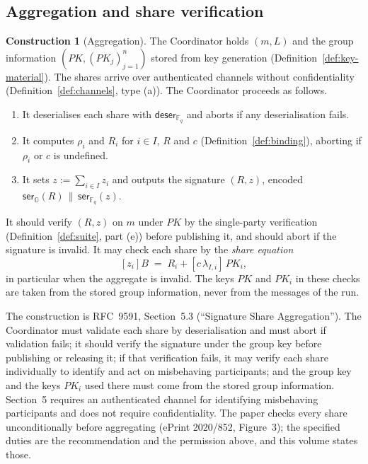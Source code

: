 \documentclass[11pt,a4paper]{article}
\theoremstyle{definition}
\newtheorem{construction}[theorem]{Construction}
\newcommand{\F}{\mathbb{F}}
\newcommand{\G}{\mathbb{G}}
\newcommand{\Fq}{\F_q}
\begin{document}
\subsection{Aggregation and share verification}\label{sec:sign-agg}

\begin{construction}[Aggregation]\label{def:aggregate}
The Coordinator holds \((m, L)\) and the group information
\((\mathit{PK}, (\mathit{PK}_j)_{j=1}^{n})\) stored from key generation
(Definition~\ref{def:key-material}). The shares arrive over authenticated
channels without confidentiality (Definition~\ref{def:channels}, type
(a)). The Coordinator proceeds as follows.
\begin{enumerate}
\item It deserialises each share with \(\mathsf{deser}_{\Fq}\) and aborts if
  any deserialisation fails.
\item It computes \(\rho_i\) and \(R_i\) for \(i \in I\), \(R\) and \(c\)
  (Definition~\ref{def:binding}), aborting if \(\rho_i\) or \(c\) is
  undefined.
\item It sets \(z := \sum_{i \in I} z_i\) and outputs the signature
  \((R, z)\), encoded
  \(\mathsf{ser}_{\G}(R) \,\|\, \mathsf{ser}_{\Fq}(z)\).
\end{enumerate}
It should verify \((R, z)\) on \(m\) under \(\mathit{PK}\) by the
single-party verification (Definition~\ref{def:suite}, part (e)) before
publishing it, and should abort if the signature is invalid. It may check
each share by the \emph{share equation}
\[
  [z_i]B \;=\; R_i + [c\, \lambda_{I,i}]\,\mathit{PK}_i ,
\]
in particular when the aggregate is invalid. The keys \(\mathit{PK}\) and
\(\mathit{PK}_i\) in these checks are taken from the stored group
information, never from the messages of the run.
\end{construction}

The construction is RFC~9591, Section~5.3 (``Signature Share
Aggregation''). The Coordinator must validate each share by deserialisation
and must abort if validation fails; it should verify the signature under
the group key before publishing or releasing it; if that verification
fails, it may verify each share individually to identify and act on
misbehaving participants; and the group key and the keys \(\mathit{PK}_i\)
used there must come from the stored group information. Section~5
requires an authenticated channel for identifying misbehaving participants
and does not require confidentiality. The paper checks every share
unconditionally before aggregating (ePrint 2020/852, Figure~3); the
specified duties are the recommendation and the permission above, and this
volume states those.
\end{document}
